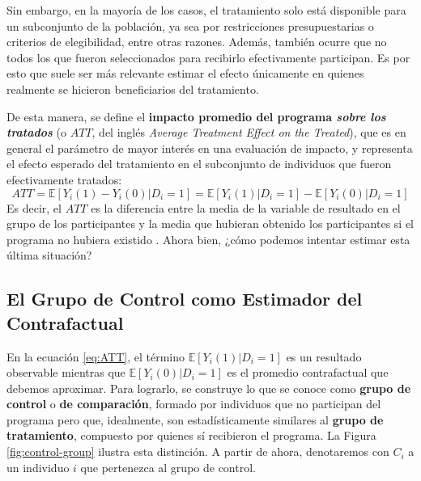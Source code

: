 \documentclass[../../main.tex]{subfiles}
\begin{document}
Sin embargo, en la mayoría de los casos, el tratamiento solo está disponible para un
subconjunto de la población, ya sea por restricciones presupuestarias o criterios de
elegibilidad, entre otras razones. Además, también ocurre que no todos los que fueron
seleccionados para recibirlo efectivamente participan. Es por esto que suele ser más
relevante estimar el efecto únicamente en quienes realmente se hicieron beneficiarios del
tratamiento.

De esta manera, se define el \textbf{impacto promedio del programa \textit{sobre los
tratados}} (o \(ATT\), del inglés \textit{Average Treatment Effect on the Treated}), que
es en general el parámetro de mayor interés en una evaluación de impacto, y representa el
efecto esperado del tratamiento en el subconjunto de individuos que fueron efectivamente
tratados:
\begin{equation}
    ATT = \mathbb{E} \left[Y_i(1)-Y_i(0)|D_i=1\right] = \mathbb{E} \left[Y_i(1)|D_i=1\right] -
    \mathbb{E} \left[Y_i(0)|D_i=1\right]
    \label{eq:ATT}
\end{equation}
Es decir, el \(ATT\) es la diferencia entre la media de la variable de resultado en el
grupo de los participantes y la media que hubieran obtenido los participantes si el
programa no hubiera existido \cite{bernal}. Ahora bien, ¿cómo podemos intentar estimar
esta última situación?

\subsection{El Grupo de Control como Estimador del Contrafactual}
En la ecuación \ref{eq:ATT}, el término \(\mathbb{E} \left[Y_i(1)|D_i=1\right]\) es un
resultado observable mientras que \(\mathbb{E} \left[Y_i(0)|D_i=1\right]\) es el promedio
contrafactual que debemos aproximar. Para lograrlo, se construye lo que se conoce como
\textbf{grupo de control} o \textbf{de comparación}, formado por individuos que no
participan del programa pero que, idealmente, son estadísticamente similares
\cite{gertler-2016} al \textbf{grupo de tratamiento}, compuesto por quienes sí recibieron
el programa. La Figura \ref{fig:control-group} ilustra esta distinción. A partir de ahora,
denotaremos con \(C_i\) a un individuo \(i\) que pertenezca al grupo de control.
\end{document}
